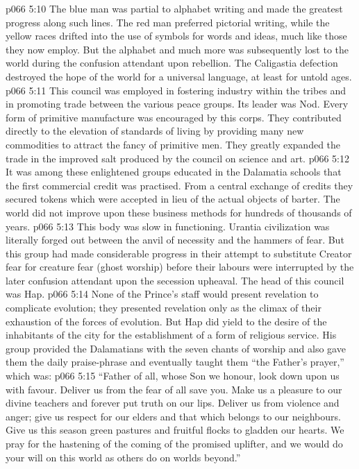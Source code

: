 \vs p066 5:10 The blue man was partial to alphabet writing and made the greatest progress along such lines. The red man preferred pictorial writing, while the yellow races drifted into the use of symbols for words and ideas, much like those they now employ. But the alphabet and much more was subsequently lost to the world during the confusion attendant upon rebellion. The Caligastia defection destroyed the hope of the world for a universal language, at least for untold ages.
\vs p066 5:11 \bibnobreakspace {} This council was employed in fostering industry within the tribes and in promoting trade between the various peace groups. Its leader was Nod. Every form of primitive manufacture was encouraged by this corps. They contributed directly to the elevation of standards of living by providing many new commodities to attract the fancy of primitive men. They greatly expanded the trade in the improved salt produced by the council on science and art.
\vs p066 5:12 It was among these enlightened groups educated in the Dalamatia schools that the first commercial credit was practised. From a central exchange of credits they secured tokens which were accepted in lieu of the actual objects of barter. The world did not improve upon these business methods for hundreds of thousands of years.
\vs p066 5:13 \bibnobreakspace {} This body was slow in functioning. Urantia civilization was literally forged out between the anvil of necessity and the hammers of fear. But this group had made considerable progress in their attempt to substitute Creator fear for creature fear (ghost worship) before their labours were interrupted by the later confusion attendant upon the secession upheaval. The head of this council was Hap.
\vs p066 5:14 None of the Prince’s staff would present revelation to complicate evolution; they presented revelation only as the climax of their exhaustion of the forces of evolution. But Hap did yield to the desire of the inhabitants of the city for the establishment of a form of religious service. His group provided the Dalamatians with the seven chants of worship and also gave them the daily praise\hyp{}phrase and eventually taught them “the Father’s prayer,” which was:
\vs p066 5:15 \pc “Father of all, whose Son we honour, look down upon us with favour. Deliver us from the fear of all save you. Make us a pleasure to our divine teachers and forever put truth on our lips. Deliver us from violence and anger; give us respect for our elders and that which belongs to our neighbours. Give us this season green pastures and fruitful flocks to gladden our hearts. We pray for the hastening of the coming of the promised uplifter, and we would do your will on this world as others do on worlds beyond.”
